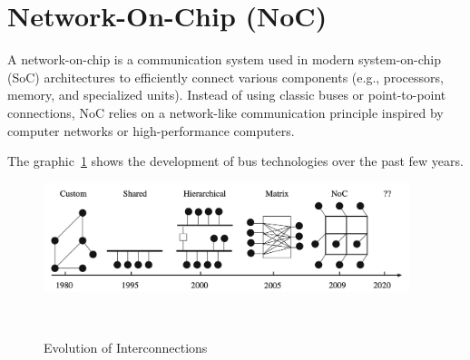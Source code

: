 \section{Network-On-Chip (NoC)}
A network-on-chip is a communication system used in modern system-on-chip (SoC) architectures to efficiently connect various components (e.g., processors, memory, and specialized units). Instead of using classic buses or point-to-point connections, NoC relies on a network-like communication principle inspired by computer networks or high-performance computers. 

The graphic~\ref{fig:Evolution_of_Interconnection} shows the development of bus technologies over the past few years.
\begin{figure}[htbp]
    \centering
    \includegraphics[width=0.95\textwidth]{img/Evolution of On-Chip communication interconnect.png}
    \caption{Evolution of Interconnections}~\cite{BenAbdallah2013}\label{fig:Evolution_of_Interconnection}
\end{figure}

